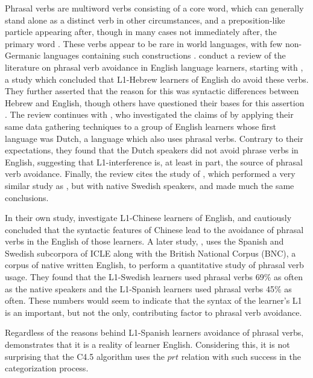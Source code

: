 \documentclass[main.tex]{subfiles}
\begin{document}
Phrasal verbs are multiword verbs consisting of a core word, which can generally stand alone as a distinct verb in other circumstances, and a preposition-like particle appearing after, though in many cases not immediately after, the primary word \citep{celce-murcia:1999}. These verbs appear to be rare in world languages, with few non-Germanic languages containing such constructions \citep{celce-murcia:1999}. \citet{liao:2004} conduct a review of the literature on phrasal verb avoidance in English language learners, starting with \citep{dagut:1985}, a study which concluded that L1-Hebrew learners of English do avoid these verbs. They further asserted that the reason for this was syntactic differences between Hebrew and English, though others have questioned their bases for this assertion \citep{liao:2004}. The review continues with \citep{hulstijn:1989}, who investigated the claims of \citeauthor{dagut:1985} by applying their same data gathering techniques to a group of English learners whose first language was Dutch, a language which also uses phrasal verbs. Contrary to their expectations, they found that the Dutch speakers did not avoid phrase verbs in English, suggesting that L1-interference is, at least in part, the source of phrasal verb avoidance. Finally, the review cites the study of \citet{laufer:1993}, which performed a very similar study as \citeauthor{hulstijn:1989}, but with native Swedish speakers, and made much the same conclusions.

In their own study, \citeauthor{liao:2004} investigate L1-Chinese learners of English, and cautiously concluded that the syntactic features of Chinese lead to the avoidance of phrasal verbs in the English of those learners. A later study, \citet{gonzalez:2010}, uses the Spanish and Swedish subcorpora of ICLE along with the British National Corpus (BNC), a corpus of native written English, to perform a quantitative study of phrasal verb usage. They found that the L1-Swedish learners used phrasal verbs 69\% as often as the native speakers and the L1-Spanish learners used phrasal verbs 45\% as often. These numbers would seem to indicate that the syntax of the learner's L1 is an important, but not the only, contributing factor to phrasal verb avoidance.

Regardless of the reasons behind L1-Spanish learners avoidance of phrasal verbs, \citet{gonzalez:2010} demonstrates that it is a reality of learner English. Considering this, it is not surprising that the C4.5 algorithm uses the $prt$ relation with such success in the categorization process.
\end{document}
